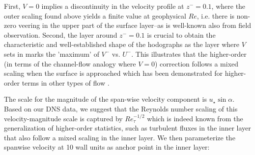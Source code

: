 \documentclass[a4paper,11pt]{article}
\begin{document}
First, $V=0$  implies a discontinuity in the velocity profile at $z^-=0.1$, where the outer scaling found above 
yields a finite value at geophysical $Re$, i.e. there is non-zero veering in the upper part of the
surface layer--as is well-known also from field observation. 
%
Second, the layer around $z^-=0.1$ is crucial to obtain the characteristic and well-established shape of the hodographs as the layer
where $V$ sets in marks the 'maximum' of $V^-$ vs. $U^-$.
%
This illustrates that the higher-order (in terms of the channel-flow analogy where $V=0$) correction follows a mixed scaling when the surface is approached which has been demonstrated for higher-order terms in other types of flow \citep{Mellado:2016hv}. 
%
\par
%
The scale for the magnitude of the span-wise velocity component is $u_\star\sin\alpha$. 
%
Based on our DNS data, we suggest that the Reynolds number scaling of this velocity-magnitude scale is captured
by $Re_\tau^{-1/2}$ which is indeed known from the generalization of higher-order statistics, such as turbulent fluxes
in the inner layer \citep{Marusic:2013hf} that also follow a mixed scaling in the inner layer.
%
We then parameterize the spanwise velocity at 10 wall units as anchor point in the inner layer:
\end{document}
